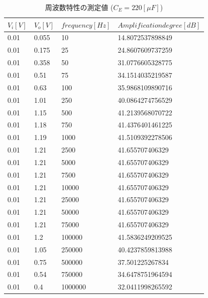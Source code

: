 \documentclass[10pt, a4j, dvipdfmx]{jarticle}
\begin{document}
    \begin{table}[H]
        \centering
        \caption{周波数特性の測定値 ($C_E = 220[\mu F]$)}
        \label{tbl:13}
        \small
        \begin{tabular}{|l|l|l|l|}
        \hline
        $V_i[V]$ & $V_o[V]$ & $frequency[Hz]$ & $Amplification degree[dB]$ \\ \hline
        0.01     & 0.055    & 10              & 14.8072537898849           \\ \hline
        0.01     & 0.175    & 25              & 24.8607609737259           \\ \hline
        0.01     & 0.358    & 50              & 31.0776605328775           \\ \hline
        0.01     & 0.51     & 75              & 34.1514035219587           \\ \hline
        0.01     & 0.63     & 100             & 35.9868109890716           \\ \hline
        0.01     & 1.01     & 250             & 40.0864274756529           \\ \hline
        0.01     & 1.15     & 500             & 41.2139568070722           \\ \hline
        0.01     & 1.18     & 750             & 41.4376401461225           \\ \hline
        0.01     & 1.19     & 1000            & 41.5109392278506           \\ \hline
        0.01     & 1.21     & 2500            & 41.655707406329            \\ \hline
        0.01     & 1.21     & 5000            & 41.655707406329            \\ \hline
        0.01     & 1.21     & 7500            & 41.655707406329            \\ \hline
        0.01     & 1.21     & 10000           & 41.655707406329            \\ \hline
        0.01     & 1.21     & 25000           & 41.655707406329            \\ \hline
        0.01     & 1.21     & 50000           & 41.655707406329            \\ \hline
        0.01     & 1.21     & 75000           & 41.655707406329            \\ \hline
        0.01     & 1.2      & 100000          & 41.5836249209525           \\ \hline
        0.01     & 1.05     & 250000          & 40.4237859813988           \\ \hline
        0.01     & 0.75     & 500000          & 37.501225267834            \\ \hline
        0.01     & 0.54     & 750000          & 34.6478751964594           \\ \hline
        0.01     & 0.4      & 1000000         & 32.0411998265592           \\ \hline
        \end{tabular}
        \normalsize
    \end{table}
\end{document}
